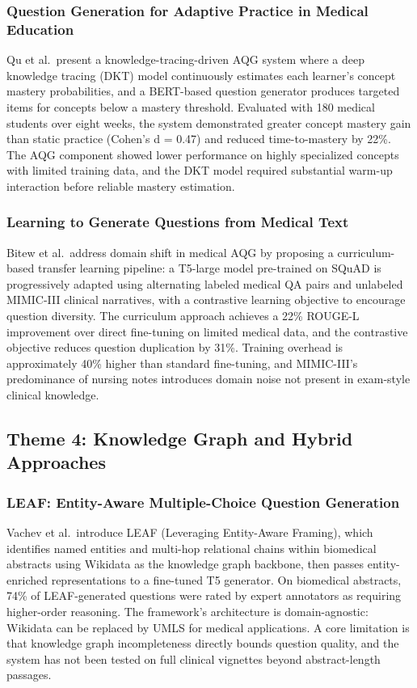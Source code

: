 \documentclass[conference]{IEEEtran}
\begin{document}
\subsubsection{Question Generation for Adaptive Practice in Medical Education~\cite{qu2021adaptive}}
Qu et al.\ present a knowledge-tracing-driven AQG system where a deep knowledge tracing (DKT) model continuously estimates each learner's concept mastery probabilities, and a BERT-based question generator produces targeted items for concepts below a mastery threshold. Evaluated with 180 medical students over eight weeks, the system demonstrated greater concept mastery gain than static practice (Cohen's d = 0.47) and reduced time-to-mastery by 22\%. The AQG component showed lower performance on highly specialized concepts with limited training data, and the DKT model required substantial warm-up interaction before reliable mastery estimation.

\subsubsection{Learning to Generate Questions from Medical Text~\cite{bitew2022learning}}
Bitew et al.\ address domain shift in medical AQG by proposing a curriculum-based transfer learning pipeline: a T5-large model pre-trained on SQuAD is progressively adapted using alternating labeled medical QA pairs and unlabeled MIMIC-III clinical narratives, with a contrastive learning objective to encourage question diversity. The curriculum approach achieves a 22\% ROUGE-L improvement over direct fine-tuning on limited medical data, and the contrastive objective reduces question duplication by 31\%. Training overhead is approximately 40\% higher than standard fine-tuning, and MIMIC-III's predominance of nursing notes introduces domain noise not present in exam-style clinical knowledge.

\subsection{Theme 4: Knowledge Graph and Hybrid Approaches}

\subsubsection{LEAF: Entity-Aware Multiple-Choice Question Generation~\cite{vachev2022leaf}}
Vachev et al.\ introduce LEAF (Leveraging Entity-Aware Framing), which identifies named entities and multi-hop relational chains within biomedical abstracts using Wikidata as the knowledge graph backbone, then passes entity-enriched representations to a fine-tuned T5 generator. On biomedical abstracts, 74\% of LEAF-generated questions were rated by expert annotators as requiring higher-order reasoning. The framework's architecture is domain-agnostic: Wikidata can be replaced by UMLS for medical applications. A core limitation is that knowledge graph incompleteness directly bounds question quality, and the system has not been tested on full clinical vignettes beyond abstract-length passages.
\end{document}
